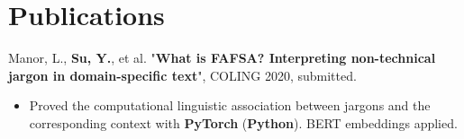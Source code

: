\documentclass[letterpaper,11pt]{article}
\newcommand{\resumeItem}[1]{
  \item\small{
    {#1 \vspace{-2pt}}
  }
}
\newcommand{\resumeSubHeadingListStart}{\begin{itemize}[leftmargin=*]}
\newcommand{\resumeSubHeadingListEnd}{\end{itemize}}
\newcommand{\pubItemListStart}{\begin{itemize}\setlength{\itemsep}{0pt} \setlength{\parsep}{0pt} \setlength{\parskip}{0pt}}
\newcommand{\pubItemListEnd}{\end{itemize}\vspace{-5pt}}
\begin{document}
\section{Publications}
Manor, L., \textbf{Su, Y.}, et al. "\textbf{What is FAFSA? Interpreting non-technical jargon in domain-specific text}", COLING 2020, submitted.  
\pubItemListStart
	\vspace{-7pt}\resumeItem{Proved the computational linguistic association between jargons and the corresponding context with \textbf{PyTorch} (\textbf{Python}). BERT embeddings applied.}
	
\pubItemListEnd

%


%


\end{document}
